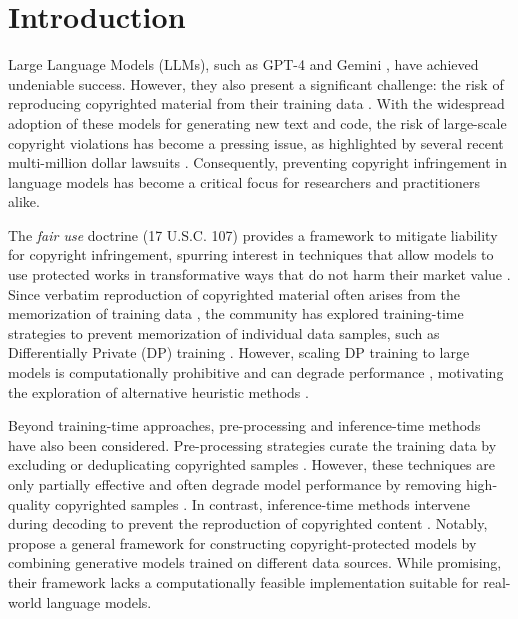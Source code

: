 \section{Introduction}

Large Language Models (LLMs), such as GPT-4 \citep{achiam2023gpt} and Gemini \citep{team2023gemini}, have achieved undeniable success. However, they also present a significant challenge: the risk of reproducing copyrighted material from their training data \citep{sag66new,yu2023codeiipprompt, karamolegkou2023copyright}. With the widespread adoption of these models for generating new text and code, the risk of large-scale copyright violations has become a pressing issue, as highlighted by several recent multi-million dollar lawsuits \citep{henderson2023foundation}. Consequently, preventing copyright infringement in language models has become a critical focus for researchers and practitioners alike.

The \textit{fair use} doctrine (17 U.S.C. 107) provides a framework to mitigate liability for copyright infringement, spurring interest in techniques that allow models to use protected works in transformative ways that do not harm their market value \citep{henderson2023foundation}. Since verbatim reproduction of copyrighted material often arises from the memorization of training data \citep{carlini2021extracting, Somepalli2022DiffusionAO, carlini2023quantifying, mm_mem2024}, the community has explored training-time strategies to prevent memorization of individual data samples, such as Differentially Private (DP) training \citep{dwork2014algorithmic, abadi2016deep}. However, scaling DP training to large models is computationally prohibitive and can degrade performance \citep{anil2022large}, motivating the exploration of alternative heuristic methods \citep{hans2024like}.



Beyond training-time approaches, pre-processing and inference-time methods have also been considered. Pre-processing strategies curate the training data by excluding or deduplicating copyrighted samples \citep{kandpal2022deduplicating, kocetkov2022stack, min2023silo}. However, these techniques are only partially effective \citep{lee2023talkin, ippolito2023preventing} and often degrade model performance by removing high-quality copyrighted samples \citep{Meeus2023DidTN}. In contrast, inference-time methods intervene during decoding to prevent the reproduction of copyrighted content \citep{wei2024evaluating}. Notably, \citet{vyas2023provable} propose a general framework for constructing copyright-protected models by combining generative models trained on different data sources. While promising, their framework lacks a computationally feasible implementation suitable for real-world language models.

